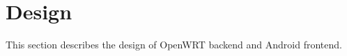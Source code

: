 \section{Design}
	
	
		
		
		
		
	

This section describes the design of OpenWRT backend and Android frontend.




